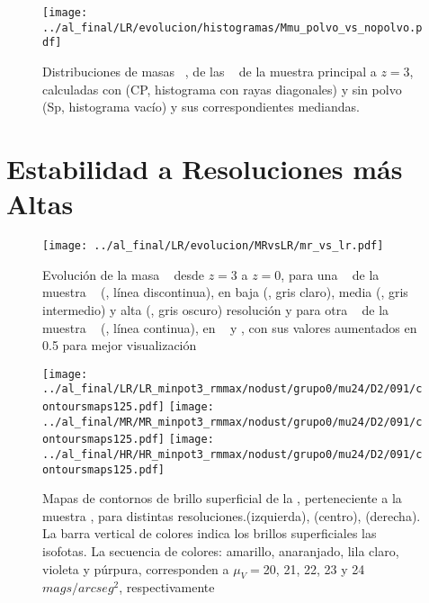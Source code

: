 \begin{figure}[H]
 \centering
 \texttt{[image: ../al\_final/LR/evolucion/histogramas/Mmu\_polvo\_vs\_nopolvo.pdf]}
\caption{Distribuciones de masas \mvc~, de las \bcgs~ de la muestra principal a $z=3$, calculadas con (CP, histograma con rayas diagonales) y sin polvo (Sp, histograma vac\'io) y sus correspondientes mediandas.}
\label{fig:histpnp}
\end{figure}


\section{Estabilidad a Resoluciones m\'as Altas}
\begin{figure}[H]
 \centering
 \texttt{[image: ../al\_final/LR/evolucion/MRvsLR/mr\_vs\_lr.pdf]}
\caption{Evoluci\'on de la masa \mvc~ desde $z=3$ a $z=0$, para una \bcg~ de la muestra \cmen~ (, l\'inea discontinua), en baja (\lr, gris claro), media (\mr, gris intermedio) y alta (\hr, gris oscuro) resoluci\'on y para otra
\bcg~ de la muestra \cmay~ (, l\'inea continua), en \lr~ y \mr, con sus valores aumentados en 0.5 para mejor visualizaci\'on}
\label{fig:estabilidad}
\end{figure}

\begin{figure}[H]
 \hspace*{-1.4cm}\texttt{[image: ../al\_final/LR/LR\_minpot3\_rmmax/nodust/grupo0/mu24/D2/091/contoursmaps125.pdf]}
  \hspace*{-.1cm}\texttt{[image: ../al\_final/MR/MR\_minpot3\_rmmax/nodust/grupo0/mu24/D2/091/contoursmaps125.pdf]}
  \hspace*{-.1cm}\texttt{[image: ../al\_final/HR/HR\_minpot3\_rmmax/nodust/grupo0/mu24/D2/091/contoursmaps125.pdf]}
\caption{Mapas de contornos de brillo superficial de la , perteneciente a la muestra \cmen, para distintas resoluciones.\lr (izquierda), \mr (centro), \hr(derecha).
La barra vertical de colores indica los brillos superficiales las isofotas. 
La secuencia de colores: amarillo, anaranjado, lila claro, violeta y  p\'urpura, corresponden a $\mu_{V}= $20, 21, 22, 23 y 24 $mags/arcseg^{2}$, respectivamente}
\label{fig:isofotas}
\end{figure}


